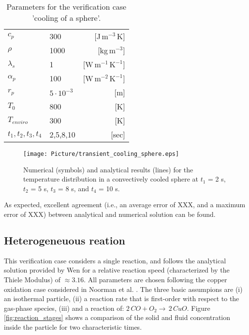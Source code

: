 \documentclass{particles2015}
\begin{document}
\begin{table}[h]
  \centering 
  \caption{Parameters for the verification case 'cooling of a sphere'.}
   \begin{tabular}{llr}
      \hline 
        $c_p$                   &300       & [J$\,\text{m}^{-3}\,$K]\\   
       	$\rho$					&1000	   & [kg$\, \text{m}^{-3}$]\\
        $\lambda_s$				&1		   & [W$\, \text{m}^{-1} \,\text{K}^{-1}$]\\
        $\alpha_p$ 				&100	   & [W$\, \text{m}^{-2} \,\text{K}^{-1}$]\\
        $r_p$					&$5\cdot 10^{-3}$ & [m]\\
        $ T_0$					& 800& [K] \\
        $T_{enviro}$			& 300& [K]\\
        $t_1,t_2,t_3,t_4$ 		& 2,5,8,10 & [sec]\\
      \hline      
       \end{tabular}
   \setlength{\belowcaptionskip}{12pt}
   \label{tab:properties_cooling_sphere}
\end{table}


\begin{figure}[h!]
   \centering
   \texttt{[image: Picture/transient\_cooling\_sphere.eps]}
   \caption{Numerical (symbols) and analytical results (lines) for the temperature distribution in a convectively cooled sphere at $t_1$ = 2 s, $t_2$ = 5 s, $t_3$ = 8 s, and $t_4$ = 10 s.}
   \label{fig:Cooling_sphere}
\end{figure}

As expected, excellent agreement (i.e., an average error of XXX, and a maximum error of XXX) between analytical and numerical solution can be found.


\subsection{Heterogeneuous reation}
\label{sec:heterogeneuous_reaction}

This verification case considers a single reaction, and follows the analytical solution provided by Wen \cite{Wen} for a relative reaction speed (characterized by the Thiele Modulus) of $\approx 3.16$. All parameters are chosen following the copper oxidation case considered in Noorman et al. \cite{Noorman2011}. The three basic assumpions are (i) an isothermal particle, (ii) a reaction rate that is first-order with respect to the gas-phase species, (iii) and a reaction of: $2 \, CO + O_2 \rightarrow \, 2\, CuO$. Figure \ref{fig:reaction_stages} shows a comparison of the solid and fluid concentration inside the particle for two characteristic times.
\end{document}
